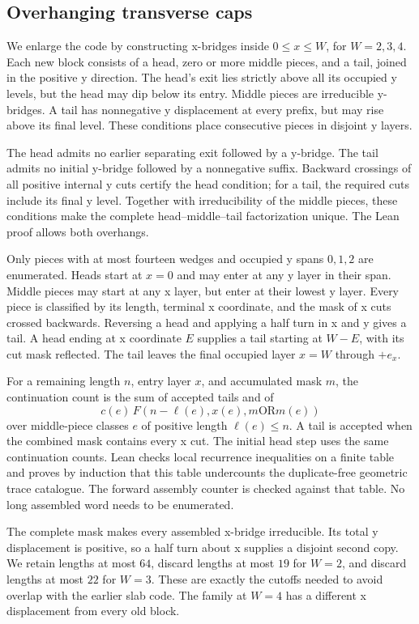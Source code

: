 \documentclass[conference]{IEEEtran}
\begin{document}
\subsection{Overhanging transverse caps}\label{sec:caps}

We enlarge the code by constructing x-bridges inside $0\leq x\leq W$,
for $W=2,3,4$. Each new block consists of a head, zero or more middle
pieces, and a tail, joined in the positive y direction.
The head's exit lies strictly above all its occupied y levels,
but the head may dip below its entry. Middle pieces are irreducible
y-bridges. A tail has nonnegative y displacement at every prefix,
but may rise above its final level. These conditions place consecutive
pieces in disjoint y layers.

The head admits no earlier separating exit followed by a y-bridge.
The tail admits no initial y-bridge followed by a nonnegative suffix.
Backward crossings of all positive internal y cuts certify the head
condition; for a tail, the required cuts include its final y level.
Together with irreducibility of the middle pieces, these conditions
make the complete head--middle--tail factorization unique.
The Lean proof allows both overhangs.

Only pieces with at most fourteen wedges and occupied y spans
$0,1,2$ are enumerated. Heads start at $x=0$ and may enter at any
y layer in their span. Middle pieces may start at any x layer,
but enter at their lowest y layer. Every piece is classified by
its length, terminal x coordinate, and the mask of x cuts crossed
backwards. Reversing a head and applying a half turn in x and y
gives a tail. A head ending at x coordinate $E$ supplies a tail
starting at $W-E$, with its cut mask reflected.
The tail leaves the final occupied layer $x=W$ through $+e_x$.

For a remaining length $n$, entry layer $x$, and accumulated mask $m$,
the continuation count is the sum of accepted tails and of
\[
 c(e)\,F(n-\ell(e),x(e),m\mathbin{\mathrm{OR}}m(e))
\]
over middle-piece classes $e$ of positive length $\ell(e)\leq n$.
A tail is accepted when the combined mask contains every x cut.
The initial head step uses the same continuation counts.
Lean checks local recurrence inequalities on a finite table and
proves by induction that this table undercounts the duplicate-free
geometric trace catalogue. The forward assembly counter is checked
against that table. No long assembled word needs to be enumerated.

The complete mask makes every assembled x-bridge irreducible.
Its total y displacement is positive, so a half turn about x
supplies a disjoint second copy. We retain lengths at most $64$,
discard lengths at most $19$ for $W=2$, and discard lengths at most
$22$ for $W=3$. These are exactly the cutoffs needed to avoid
overlap with the earlier slab code. The family at $W=4$ has a
different x displacement from every old block.
\end{document}
